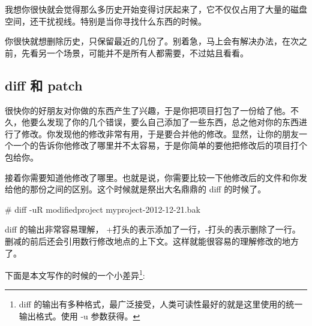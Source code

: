 我想你很快就会觉得那么多历史开始变得讨厌起来了，它不仅仅占用了大量的磁盘空间，还干扰视线。特别是当你寻找什么东西的时候。

你很快就想删除历史，只保留最近的几份了。别着急，马上会有解决办法，在次之前，先看另一个场景，可能并不是所有人都需要，不过姑且看看。

\subsection{diff 和 patch}

很快你的好朋友对你做的东西产生了兴趣，于是你把项目打包了一份给了他。不久，他要么发现了你的几个错误，要么自己添加了一些东西，总之他对你的东西进行了修改。你发现他的修改非常有用，于是要合并他的修改。显然，让你的朋友一个一个的告诉你他修改了哪里并不太容易，于是你简单的要他把修改后的项目打个包给你。

接着你需要知道他修改了哪里。也就是说，你需要比较一下他修改后的文件和你发给他的那份之间的区别。这个时候就是祭出大名鼎鼎的 diff 的时候了。

\begin{code}
\# diff -uR modifiedproject  myproject-2012-12-21.bak
\end{code}

diff 的输出非常容易理解， +打头的表示添加了一行，-打头的表示删除了一行。删减的前后还会引用数行修改地点的上下文。这样就能很容易的理解修改的地方了。

下面是本文写作的时候的一个小差异\footnote{diff 的输出有多种格式，最广泛接受，人类可读性最好的就是这里使用的统一输出格式。使用 -u 参数获得。}:


